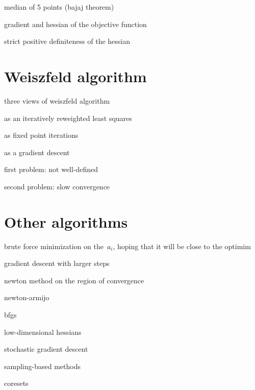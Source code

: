 median of 5 points (bajaj theorem)

gradient and hessian of the objective function

strict positive definiteness of the hessian

\section{Weiszfeld algorithm}

three views of weiszfeld algorithm

as an iteratively reweighted least squares

as fixed point iterations

as a gradient descent

first problem: not well-defined

second problem: slow convergence


\section{Other algorithms}

brute force minimization on the~$a_i$, hoping that it will be close to the
optimim

gradient descent with larger steps

newton method on the region of convergence

newton-armijo

bfgs

low-dimensional hessians

stochastic gradient descent

sampling-based methods

coresets




